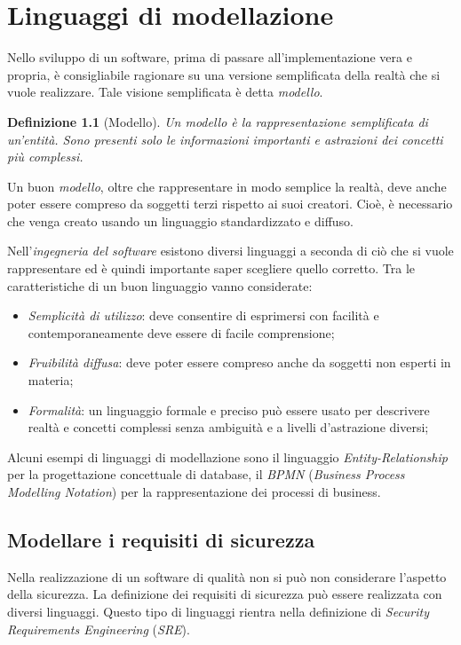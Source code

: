 \documentclass[12pt, a4paper]{report}
\theoremstyle{def}
\newtheorem{definition}{Definizione}
\theoremstyle{definition}
\begin{document}
\chapter{Linguaggi di modellazione}
Nello sviluppo di un software, prima di passare all'implementazione vera e
propria, è consigliabile ragionare su una versione semplificata della realtà
che si vuole realizzare. Tale visione semplificata è detta \emph{modello}.

\begin{definition}[Modello]
    Un \emph{modello} è la rappresentazione semplificata di un'entità. Sono
    presenti solo le informazioni importanti e astrazioni dei concetti più
    complessi.
\end{definition}\noindent
Un buon \emph{modello}, oltre che rappresentare in modo semplice la realtà, deve
anche poter essere compreso da soggetti terzi rispetto ai suoi creatori. Cioè, è
necessario che venga creato usando un linguaggio standardizzato e diffuso.

Nell'\emph{ingegneria del software} esistono diversi linguaggi a seconda di ciò
che si vuole rappresentare ed è quindi importante saper scegliere quello corretto.
Tra le caratteristiche di un buon linguaggio vanno considerate:
\begin{itemize}
    \item \emph{Semplicità di utilizzo}: deve consentire di esprimersi con
    facilità e contemporaneamente deve essere di facile comprensione;
    \item \emph{Fruibilità diffusa}: deve poter essere compreso anche da soggetti
    non esperti in materia;
    \item \emph{Formalità}: un linguaggio formale e preciso può essere usato per
    descrivere realtà e concetti complessi senza ambiguità e a livelli d'astrazione
    diversi;
\end{itemize}
Alcuni esempi di linguaggi di modellazione sono il linguaggio
\emph{Entity-Relationship} per la progettazione concettuale di database, il
\emph{BPMN} (\emph{Business Process Modelling Notation}) per la rappresentazione dei
processi di business.

\section{Modellare i requisiti di sicurezza}
Nella realizzazione di un software di qualità non si può non considerare
l'aspetto della sicurezza. La definizione dei requisiti di sicurezza può
essere realizzata con diversi linguaggi. Questo tipo di linguaggi rientra nella
definizione di \emph{Security Requirements Engineering} (\emph{SRE}).
\end{document}
